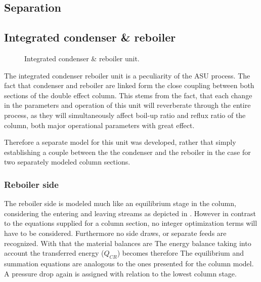 \subsection{Separation}
\label{sec:mathpro:steady:sep}
    

 \subsection{Integrated condenser \& reboiler}
    \label{sec:mathpro:steady:conreb}
        \begin{figure}
            \center
            
            \caption{Integrated condenser \& reboiler unit.}
            \label{fig:mathpro:conreb_ss}
        \end{figure}

        The integrated condenser reboiler unit is a peculiarity of the ASU process. The fact that condenser and
        reboiler are linked form the close coupling between both sections of the double effect column.
        This stems from the fact, that each change in the parameters and operation of this unit will reverberate
        through the entire process, as they will simultaneously affect boil-up ratio and reflux
        ratio of the column, both major operational parameters with great effect.

        Therefore a separate model for this unit was developed, rather that simply establishing a couple between the
        the condenser and the reboiler in the case for two separately modeled column sections.

        \subsubsection{Reboiler side}
            The reboiler side is modeled much like an equilibrium stage in the column, considering the entering
            and leaving streams as depicted in . However in contrast to the
            equations supplied for a column section, no integer optimization terms will have to be considered.
            Furthermore no side draws, or separate feeds are recognized. With that the material balances are
            The energy balance taking into account the transferred energy ($Q_{CR}$) becomes therefore
            The equilibrium and summation equations are analogous to the ones presented for the column model.
            A pressure drop again is assigned with relation to the lowest column stage.

